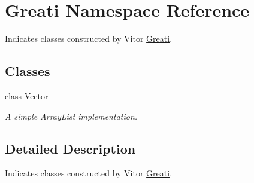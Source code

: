 \hypertarget{namespaceGreati}{}\section{Greati Namespace Reference}
\label{namespaceGreati}


Indicates classes constructed by Vitor \hyperlink{namespaceGreati}{Greati}.  


\subsection*{Classes}
\begin{DoxyCompactItemize}
\item 
class \hyperlink{classGreati_1_1Vector}{Vector}
\begin{DoxyCompactList}\small\item\em A simple Array\+List implementation. \end{DoxyCompactList}\end{DoxyCompactItemize}


\subsection{Detailed Description}
Indicates classes constructed by Vitor \hyperlink{namespaceGreati}{Greati}. 